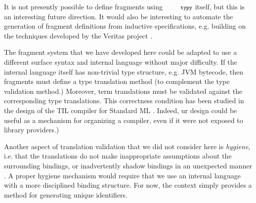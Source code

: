 \documentclass[10pt]{sigplanconf}
\newcommand{\typy}{\texttt{\footnotesize typy}}
\begin{document}
It is not presently possible to define fragments using $\typy$ itself, but this is an interesting future direction. It would also be interesting to automate the generation of fragment definitions from inductive specifications, e.g. building on the techniques developed by the Veritas project \cite{grewe2015type}. 





The fragment system that we have developed here could be adapted to use a different surface syntax and internal language without major difficulty. If the internal language itself has non-trivial type structure, e.g. JVM bytecode, then fragments must define a type translation method (to complement the type validation method.) Moreover, term translations must be validated against the corresponding type translations. This correctness condition has been studied in the design of the TIL compiler for Standard ML \cite{tarditi+:til-OLD}. Indeed, ur design could be useful as a mechanism for organizing a compiler, even if it were not exposed to library providers.)

Another aspect of translation validation that we did not consider here is \emph{hygiene}, i.e. that the translations do not make inappropriate assumptions about the surrounding bindings, or inadvertently shadow bindings in an unexpected manner \cite{Kohlbecker86a,DBLP:conf/popl/Adams15}. A proper hygiene mechanism would require that we use an internal language with a more disciplined binding structure. For now, the context simply provides a method for generating unique identifiers.
\end{document}
